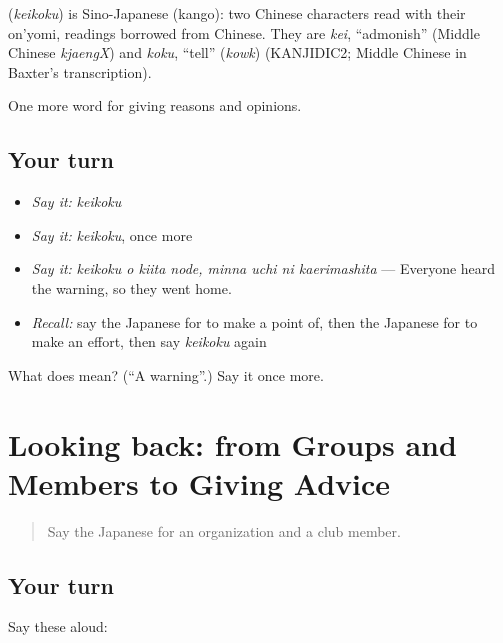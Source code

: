 \begin{cousinweb}
\textbf{} (\emph{keikoku}) is Sino-Japanese (kango): two Chinese characters read with their on'yomi, readings borrowed from Chinese. They are \emph{kei}, \textquotedblleft{}admonish\textquotedblright{} (Middle Chinese \emph{kjaengX}) and \emph{koku}, \textquotedblleft{}tell\textquotedblright{} (\emph{kowk}) (KANJIDIC2; Middle Chinese in Baxter's transcription).
\end{cousinweb}

\begin{grammarlens}[title={What you've built}]
One more word for giving reasons and opinions.
\end{grammarlens}

\subsection*{Your turn}
\begin{itemize}
\raggedright
  \item \emph{Say it:} \emph{keikoku}
  \item \emph{Say it:} \emph{keikoku}, once more
  \item \emph{Say it:} \emph{keikoku o kiita node, minna uchi ni kaerimashita} — Everyone heard the warning, so they went home.
  \item \emph{Recall:} say the Japanese for to make a point of, then the Japanese for to make an effort, then say \emph{keikoku} again
\end{itemize}

\begin{tcolorbox}[breakable,colback=teal!4,colframe=teal!35!black,title={Before you move on}]
What does  mean? (\textquotedblleft{}A warning\textquotedblright{}.) Say it once more.
\end{tcolorbox}
\section[(dialogue)]{Looking back: from Groups and Members to Giving Advice}

\label{lesson:JA-R340-review-335-340}



\begin{quote}
Say the Japanese for an organization and a club member.
\end{quote}

\subsection*{Your turn}
Say these aloud:


